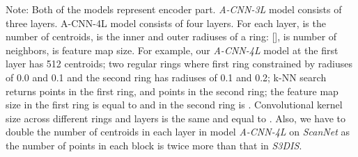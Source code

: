 \documentclass[10pt,twocolumn,letterpaper]{article}
\begin{document}
\begin{table*}[t]
\begin{tablenotes}
\footnotesize \item Note: Both of the models represent encoder part. \emph{A-CNN-3L} model consists of three layers. A-CNN-4L model consists of four layers. For each layer,  is the number of centroids,  is the inner and outer radiuses of a ring: [],  is number of neighbors,  is feature map size. For example, our \emph{A-CNN-4L} model at the first layer  has 512 centroids; two regular rings where first ring constrained by radiuses of 0.0 and 0.1 and the second ring has radiuses of 0.1 and 0.2; k-NN search returns  points in the first ring, and  points in the second ring; the feature map size in the first ring is equal to  and in the second ring is . Convolutional kernel size across different rings and layers is the same and equal to . Also, we have to double the number of centroids in each layer in model \emph{A-CNN-4L} on \emph{ScanNet} as the number of points in each block is twice more than that in \emph{S3DIS}.\vspace{-2mm}
 \end{tablenotes}
 \label{table:network_configs}
\end{table*}

\vspace{-1mm}
\end{document}
